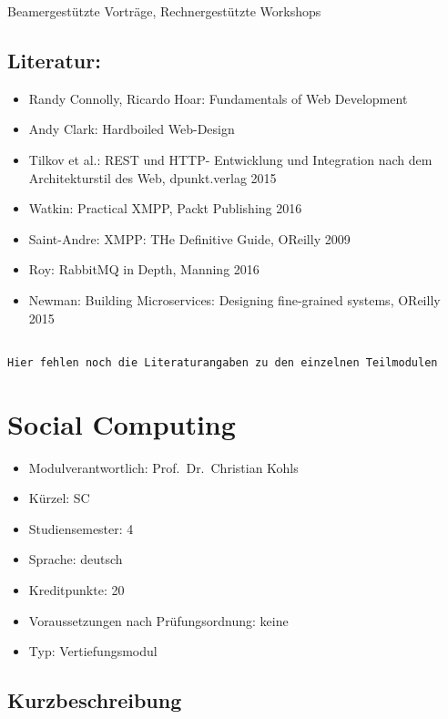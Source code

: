 Beamergestützte Vorträge, Rechnergestützte Workshops

\section*{Literatur:}\label{literatur-22}

\begin{itemize}
\tightlist
\item
  Randy Connolly, Ricardo Hoar: Fundamentals of Web Development
\item
  Andy Clark: Hardboiled Web-Design
\item
  Tilkov et al.: REST und HTTP- Entwicklung und Integration nach dem
  Architekturstil des Web, dpunkt.verlag 2015
\item
  Watkin: Practical XMPP, Packt Publishing 2016
\item
  Saint-Andre: XMPP: THe Definitive Guide, OReilly 2009
\item
  Roy: RabbitMQ in Depth, Manning 2016
\item
  Newman: Building Microservices: Designing fine-grained systems,
  OReilly 2015
\end{itemize}

\begin{verbatim}

Hier fehlen noch die Literaturangaben zu den einzelnen Teilmodulen
\end{verbatim}

\chapter{Social Computing}\label{social-computing}

\begin{itemize}
\tightlist
\item
  Modulverantwortlich: Prof.~Dr.~Christian Kohls
\item
  Kürzel: SC
\item
  Studiensemester: 4
\item
  Sprache: deutsch
\item
  Kreditpunkte: 20
\item
  Voraussetzungen nach Prüfungsordnung: keine
\item
  Typ: Vertiefungsmodul
\end{itemize}

\section*{Kurzbeschreibung}\label{kurzbeschreibung-6}

